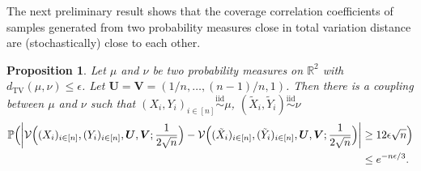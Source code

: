 \documentclass[11pt]{article}
\newtheorem{prop}[thm]{Proposition}
\newcommand{\iid}{\stackrel{\mathrm{iid}}\sim}
\newcommand{\bs}[1]{\boldsymbol{#1}}
\begin{document}
The next preliminary result shows that the coverage correlation coefficients of samples generated from two probability measures close in total variation distance are (stochastically) close to each other. 
\begin{prop}
\label{Prop:TVPerturbationFixedGrid}
Let $\mu$ and $\nu$ be two probability measures on $\mathbb{R}^2$ with $d_{\mathrm{TV}}(\mu, \nu)\leq \epsilon$. Let $\bs{U} = \bs{V} = (1/n,\ldots, (n-1)/n, 1)$. Then there is a coupling between $\mu$ and $\nu$ such that $(X_i,Y_i)_{i\in[n]}\iid \mu$, $(\tilde X_i,\tilde Y_i)\iid \nu$
\begin{align*}
    \mathbb{P}\Big(\biggl|\mathcal{V}\Bigl((X_i)_{i\in[n]}, (Y_i)_{i\in[n]}, \bs{U}, \bs{V}; \frac{1}{2\sqrt{n}}\Bigr) - \mathcal{V}\Bigl((\tilde X_i)_{i\in[n]}, (\tilde Y_i)_{i\in[n]}, \bs{U},\bs{V}; \frac{1}{2\sqrt{n}}\Bigr)\biggr| &\geq 12\epsilon\sqrt{n}\Big) \\
    &\leq e^{-n\epsilon/3}.
\end{align*}
\end{prop}
\end{document}
